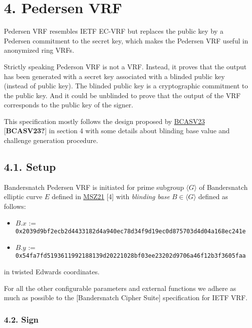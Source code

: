 \documentclass[
]{article}
\providecommand{\tightlist}{%
  \setlength{\itemsep}{0pt}\setlength{\parskip}{0pt}}
\begin{document}
\hypertarget{pedersen-vrf}{%
\section{4. Pedersen VRF}\label{pedersen-vrf}}

Pedersen VRF resembles IETF EC-VRF but replaces the public key by a
Pedersen commitment to the secret key, which makes the Pedersen VRF
useful in anonymized ring VRFs.

Strictly speaking Pederson VRF is not a VRF. Instead, it proves that the
output has been generated with a secret key associated with a blinded
public key (instead of public key). The blinded public key is a
cryptographic commitment to the public key. And it could be unblinded to
prove that the output of the VRF corresponds to the public key of the
signer.

This specification mostly follows the design proposed by
\href{https://eprint.iacr.org/2023/002}{BCASV23} {[}\textbf{BCASV23?}{]}
in section 4 with some details about blinding base value and challenge
generation procedure.

\hypertarget{setup-1}{%
\subsection{4.1. Setup}\label{setup-1}}

Bandersnatch Pedersen VRF is initiated for prime subgroup
\(\langle G \rangle\) of Bandersnatch elliptic curve \(E\) defined in
\href{https://eprint.iacr.org/2021/1152}{MSZ21} {[}4{]} with
\emph{blinding base} \(B \in \langle G \rangle\) defined as follows:

\begin{itemize}
\tightlist
\item
  \(B.x\) :=
  \texttt{0x2039d9bf2ecb2d4433182d4a940ec78d34f9d19ec0d875703d4d04a168ec241e}
\item
  \(B.y\) :=
  \texttt{0x54fa7fd5193611992188139d20221028bf03ee23202d9706a46f12b3f3605faa}
\end{itemize}

in twisted Edwards coordinates.

For all the other configurable parameters and external functions we
adhere as much as possible to the {[}Bandersnatch Cipher Suite{]}
specification for IETF VRF.

\hypertarget{sign-1}{%
\subsubsection{4.2. Sign}\label{sign-1}}
\end{document}
